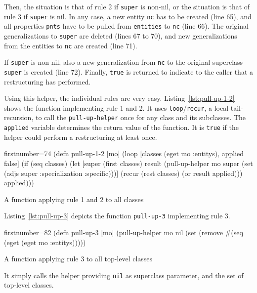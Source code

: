 \documentclass[11pt]{article}
\begin{document}
Then, the situation is that of rule 2 if \verb|super| is non-nil, or the
situation is that of rule 3 if \verb|super| is nil.  In any case, a new entity
\verb|nc| has to be created (line 65), and all properties \verb|pnts| have to
be pulled from \verb|entities| to \verb|nc| (line 66).  The original
generalizations to \verb|super| are deleted (lines 67 to 70), and new
generalizations from the entities to \verb|nc| are created (line 71).

If \verb|super| is non-nil, also a new generalization from \verb|nc| to the
original superclass \verb|super| is created (line 72).  Finally, \verb|true| is
returned to indicate to the caller that a restructuring has performed.

Using this helper, the individual rules are very easy.
Listing~\ref{lst:pull-up-1-2} shows the function implementing rule 1 and 2.  It
uses \verb|loop|/\verb|recur|, a local tail-recursion, to call the
\verb|pull-up-helper| once for any class and its subclasses.  The
\verb|applied| variable determines the return value of the function.  It is
\verb|true| if the helper could perform a restructuring at least once.


\begin{listing}[htbp]
  \begin{clojurecode*}{firstnumber=74}
(defn pull-up-1-2 [mo]
  (loop [classes (eget mo :entitys), applied false]
    (if (seq classes)
      (let [super (first classes)
            result (pull-up-helper
                    mo super (set (adjs super :specialization :specific)))]
        (recur (rest classes) (or result applied)))
      applied)))
  \end{clojurecode*}
  \caption{A function applying rule 1 and 2 to all classes}
    \label{lst:pull-up-1-2}
\end{listing}

Listing~\ref{lst:pull-up-3} depicts the function \verb|pull-up-3| implementing
rule 3.

\begin{listing}[htbp]
  \begin{clojurecode*}{firstnumber=82}
(defn pull-up-3 [mo]
  (pull-up-helper mo nil (set (remove #(seq (eget %
                                      (eget mo :entitys)))))
  \end{clojurecode*}
  \caption{A function applying rule 3 to all top-level classes}
    \label{lst:pull-up-3}
\end{listing}

It simply calls the helper providing \verb|nil| as superclass parameter, and
the set of top-level classes.
\end{document}
